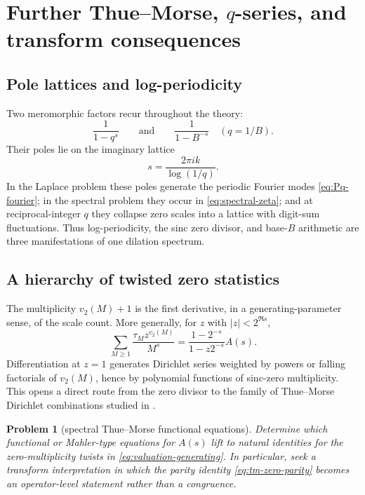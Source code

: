 \documentclass[11pt]{article}
\newtheorem{problem}[theorem]{Problem}
\theoremstyle{definition}
\theoremstyle{remark}
\begin{document}
\section{Further Thue--Morse, $q$-series, and transform consequences}

\subsection{Pole lattices and log-periodicity}

Two meromorphic factors recur throughout the theory:
\[
 \frac1{1-q^s}
 \qquad\text{and}\qquad
 \frac1{1-B^{-s}}\quad(q=1/B).
\]
Their poles lie on the imaginary lattice
\[
 s=\frac{2\pi ik}{\log(1/q)}.
\]
In the Laplace problem these poles generate the periodic Fourier modes \cref{eq:Pq-fourier}; in the spectral problem they occur in \cref{eq:spectral-zeta}; and at reciprocal-integer $q$ they collapse zero scales into a lattice with digit-sum fluctuations.  Thus log-periodicity, the sinc zero divisor, and base-$B$ arithmetic are three manifestations of one dilation spectrum.

\subsection{A hierarchy of twisted zero statistics}

The multiplicity $v_2(M)+1$ is the first derivative, in a generating-parameter sense, of the scale count.  More generally, for $z$ with $|z|<2^{\Re s}$,
\begin{equation}\label{eq:valuation-generating}
 \sum_{M\ge1}\frac{\tau_M z^{v_2(M)}}{M^s}
 =\frac{1-2^{-s}}{1-z2^{-s}}A(s).
\end{equation}
Differentiation at $z=1$ generates Dirichlet series weighted by powers or falling factorials of $v_2(M)$, hence by polynomial functions of sinc-zero multiplicity.  This opens a direct route from the zero divisor to the family of Thue--Morse Dirichlet combinations studied in \cite{toth}.

\begin{problem}[spectral Thue--Morse functional equations]\label{prob:spectral-TM}
Determine which functional or Mahler-type equations for $A(s)$ lift to natural identities for the zero-multiplicity twists in \cref{eq:valuation-generating}.  In particular, seek a transform interpretation in which the parity identity \cref{eq:tm-zero-parity} becomes an operator-level statement rather than a congruence.
\end{problem}
\end{document}
